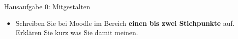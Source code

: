 \begin{frame}{Hausaufgabe 0: Mitgestalten}

\begin{itemize}
\item Schreiben Sie bei Moodle im Bereich  \textbf{einen bis zwei Stichpunkte} auf. Erklären Sie kurz  was Sie damit meinen.

\end{itemize}

\end{frame}


%
%
%


%	
%	
%	
%
%
%
